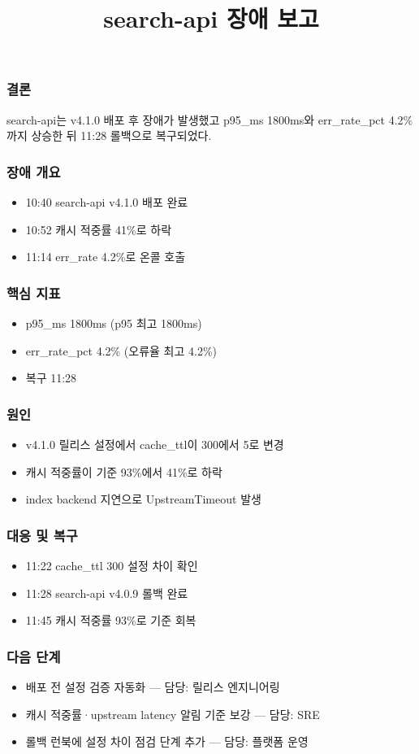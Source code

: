 \documentclass[aspectratio=169]{beamer}
\title{search-api 장애 보고}
\author{}
\date{}
\begin{document}
\begin{frame}
\frametitle{결론}
\centering
search-api는 v4.1.0 배포 후 장애가 발생했고 p95\_ms 1800ms와 err\_rate\_pct 4.2\%까지 상승한 뒤 11:28 롤백으로 복구되었다.
\end{frame}

\begin{frame}
\frametitle{장애 개요}
\begin{itemize}
  \item 10:40 search-api v4.1.0 배포 완료
  \item 10:52 캐시 적중률 41\%로 하락
  \item 11:14 err\_rate 4.2\%로 온콜 호출
\end{itemize}
\end{frame}

\begin{frame}
\frametitle{핵심 지표}
\begin{itemize}
  \item p95\_ms 1800ms (p95 최고 1800ms)
  \item err\_rate\_pct 4.2\% (오류율 최고 4.2\%)
  \item 복구 11:28
\end{itemize}
\end{frame}

\begin{frame}
\frametitle{원인}
\begin{itemize}
  \item v4.1.0 릴리스 설정에서 cache\_ttl이 300에서 5로 변경
  \item 캐시 적중률이 기준 93\%에서 41\%로 하락
  \item index backend 지연으로 UpstreamTimeout 발생
\end{itemize}
\end{frame}

\begin{frame}
\frametitle{대응 및 복구}
\begin{itemize}
  \item 11:22 cache\_ttl 300  설정 차이 확인
  \item 11:28 search-api v4.0.9 롤백 완료
  \item 11:45 캐시 적중률 93\%로 기준 회복
\end{itemize}
\end{frame}

\begin{frame}
\frametitle{다음 단계}
\begin{itemize}
  \item 배포 전 설정 검증 자동화 — 담당: 릴리스 엔지니어링
  \item 캐시 적중률·upstream latency 알림 기준 보강 — 담당: SRE
  \item 롤백 런북에 설정 차이 점검 단계 추가 — 담당: 플랫폼 운영
\end{itemize}
\end{frame}
\end{document}
